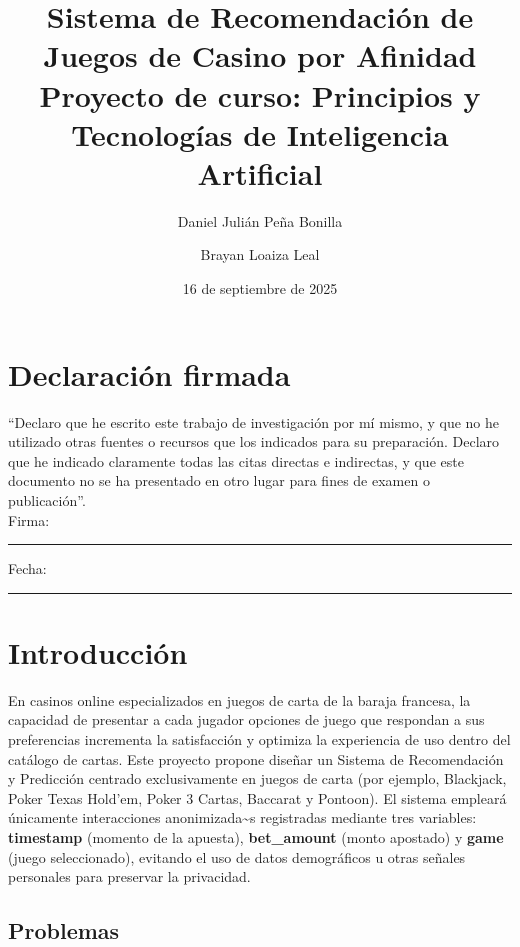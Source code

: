 \documentclass[12pt,a4paper]{article}
\title{Sistema de Recomendación de Juegos de Casino por Afinidad\\
\large Proyecto de curso: Principios y Tecnologías de Inteligencia Artificial}
\author{Daniel Julián Peña Bonilla \and Brayan Loaiza Leal}
\date{16 de septiembre de 2025}
\begin{document}
\maketitle




\section*{Declaración firmada}
\vspace{1em}
\noindent``Declaro que he escrito este trabajo de investigación por mí mismo, y que no he utilizado otras fuentes o recursos que los indicados para su preparación. Declaro que he indicado claramente todas las citas directas e indirectas, y que este documento no se ha presentado en otro lugar para fines de examen o publicación''.\\[2em]

\noindent Firma: \rule{7cm}{0.4pt} \hfill Fecha: \rule{3.5cm}{0.4pt}

\newpage
\tableofcontents
\newpage

\section{Introducción}
En casinos online especializados en juegos de carta de la baraja francesa, la capacidad de presentar a cada jugador opciones de juego que respondan a sus preferencias incrementa la satisfacción y optimiza la experiencia de uso dentro del catálogo de cartas. Este proyecto propone diseñar un Sistema de Recomendación y Predicción centrado exclusivamente en juegos de carta (por ejemplo, Blackjack, Poker Texas Hold'em, Poker 3 Cartas, Baccarat y Pontoon). El sistema empleará únicamente interacciones anonimizada\textasciitilde s registradas mediante tres variables: \textbf{timestamp} (momento de la apuesta), \textbf{bet\_amount} (monto apostado) y \textbf{game} (juego seleccionado), evitando el uso de datos demográficos u otras señales personales para preservar la privacidad.

\subsection{Problemas}
\end{document}
